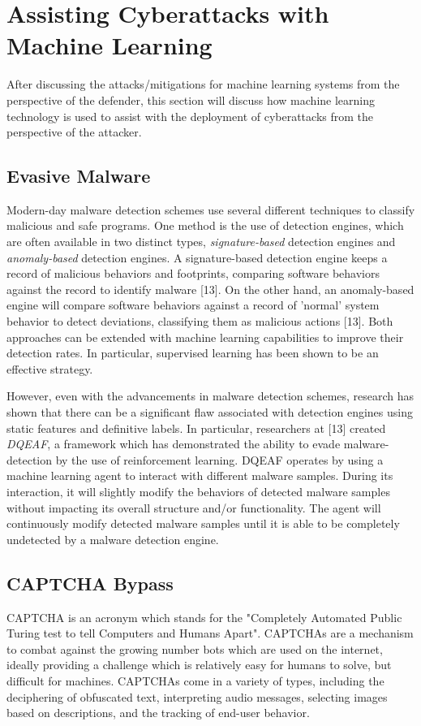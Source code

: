 \documentclass[11pt,conference]{IEEEtran}
\begin{document}
\section{Assisting Cyberattacks with Machine Learning}
After discussing the attacks/mitigations for machine learning systems
from the perspective of the defender, this section will discuss how machine
learning technology is used to assist with the deployment of cyberattacks from
the perspective of the attacker.

\subsection{Evasive Malware}
Modern-day malware detection schemes use several different techniques to
classify malicious and safe programs. One method is the use of detection
engines, which are often available in two distinct types,
\emph{signature-based} detection engines and \emph{anomaly-based} detection
engines. A signature-based detection engine keeps a record of malicious
behaviors and footprints, comparing software behaviors against the record to
identify malware [13]. On the other hand, an anomaly-based engine will
compare software behaviors against a record of 'normal' system behavior to
detect deviations, classifying them as malicious actions [13]. Both approaches can be extended with machine learning
capabilities to improve their detection rates. In particular, supervised
learning has been shown to be an effective strategy.

However, even with the advancements in malware detection schemes, research
has shown that there can be a significant flaw associated with detection
engines using static features and definitive labels. In particular, researchers
at [13] created \emph{DQEAF}, a framework which has demonstrated the ability to evade malware-detection by
the use of reinforcement learning. DQEAF operates by using a machine
learning agent to interact with different malware samples. During its
interaction, it will slightly modify the behaviors of detected malware samples
without impacting its overall structure and/or functionality. The agent will
continuously modify detected malware samples until it is able to be completely
undetected by a malware detection engine.

\subsection{CAPTCHA Bypass}
CAPTCHA is an acronym which stands for the "Completely Automated Public Turing test
to tell Computers and Humans Apart". CAPTCHAs are a 
mechanism to combat against the growing number bots which are used on the
internet, ideally providing a challenge which is relatively easy for humans to
solve, but difficult for machines. CAPTCHAs come in a variety of types,
including the deciphering of obfuscated text, interpreting audio messages,
selecting images based on descriptions, and the tracking of end-user behavior.
\end{document}
